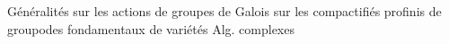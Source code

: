 Généralités sur les actions de groupes de Galois sur les compactifiés profinis de groupodes fondamentaux de variétés Alg. complexes
